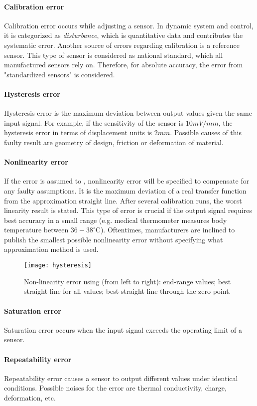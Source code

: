 \paragraph{Calibration error}
Calibration error occurs while adjusting a sensor. In dynamic system and control, it is categorized as \textit{disturbance}, which is quantitative data and contributes the systematic error. Another source of errors regarding calibration is a reference sensor. This type of sensor is considered as national standard, which all manufactured sensors rely on. Therefore, for absolute accuracy, the error from "standardized sensors" is considered.
\paragraph{Hysteresis error}
Hysteresis error is the maximum deviation between output values given the same input signal. For example, if the sensitivity of the sensor is $ 10\unit{mV/mm} $, the hysteresis error in terms of displacement units is $ 2\unit{mm} $. Possible causes of this faulty result are geometry of design, friction or deformation of material.
\paragraph{Nonlinearity error}
If the error is assumed to , nonlinearity error will be specified to compensate for any faulty assumptions. It is the maximum deviation of a real transfer function from the approximation straight line. After several calibration runs, the worst linearity result is stated. This type of error is crucial if the output signal requires best accuracy in a small range (e.g. medical thermometer measures body temperature between $ 36-38^\circ\text{C} $). Oftentimes, manufacturers are inclined to publish the smallest possible nonlinearity error without specifying what approximation method is used.
\begin{figure}
	\centering
	\texttt{[image: hysteresis]}
	\caption{Non-linearity error using (from left to right): end-range values; best straight line for all values; best straight line through the zero point.}
\end{figure}
\paragraph{Saturation error}
Saturation error occurs when the input signal exceeds the operating limit of a sensor.
\paragraph{Repeatability error}
Repeatability error causes a sensor to output different values under identical conditions. Possible noises for the error are thermal conductivity, charge, deformation, etc.
